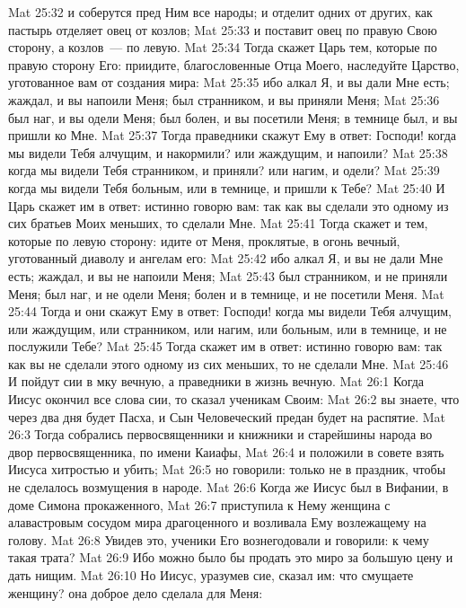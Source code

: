 \vs Mat 25:32 и соберутся пред Ним все народы; и отделит одних от других, как пастырь отделяет овец от козлов;
\vs Mat 25:33 и поставит овец по правую Свою сторону, а козлов~--- по левую.
\vs Mat 25:34 Тогда скажет Царь тем, которые по правую сторону Его: приидите, благословенные Отца Моего, наследуйте Царство, уготованное вам от создания мира:
\vs Mat 25:35 ибо алкал Я, и вы дали Мне есть; жаждал, и вы напоили Меня; был странником, и вы приняли Меня;
\vs Mat 25:36 был наг, и вы одели Меня; был болен, и вы посетили Меня; в темнице был, и вы пришли ко Мне.
\vs Mat 25:37 Тогда праведники скажут Ему в ответ: Господи! когда мы видели Тебя алчущим, и накормили? или жаждущим, и напоили?
\vs Mat 25:38 когда мы видели Тебя странником, и приняли? или нагим, и одели?
\vs Mat 25:39 когда мы видели Тебя больным, или в темнице, и пришли к Тебе?
\vs Mat 25:40 И Царь скажет им в ответ: истинно говорю вам: так как вы сделали это одному из сих братьев Моих меньших, то сделали Мне.
\vs Mat 25:41 Тогда скажет и тем, которые по левую сторону: идите от Меня, проклятые, в огонь вечный, уготованный диаволу и ангелам его:
\vs Mat 25:42 ибо алкал Я, и вы не дали Мне есть; жаждал, и вы не напоили Меня;
\vs Mat 25:43 был странником, и не приняли Меня; был наг, и не одели Меня; болен и в темнице, и не посетили Меня.
\vs Mat 25:44 Тогда и они скажут Ему в ответ: Господи! когда мы видели Тебя алчущим, или жаждущим, или странником, или нагим, или больным, или в темнице, и не послужили Тебе?
\vs Mat 25:45 Тогда скажет им в ответ: истинно говорю вам: так как вы не сделали этого одному из сих меньших, то не сделали Мне.
\vs Mat 25:46 И пойдут сии в мку вечную, а праведники в жизнь вечную.
\vs Mat 26:1 Когда Иисус окончил все слова сии, то сказал ученикам Своим:
\vs Mat 26:2 вы знаете, что через два дня будет Пасха, и Сын Человеческий предан будет на распятие.
\rsbpar\vs Mat 26:3 Тогда собрались первосвященники и книжники и старейшины народа во двор первосвященника, по имени Каиафы,
\vs Mat 26:4 и положили в совете взять Иисуса хитростью и убить;
\vs Mat 26:5 но говорили: только не в праздник, чтобы не сделалось возмущения в народе.
\rsbpar\vs Mat 26:6 Когда же Иисус был в Вифании, в доме Симона прокаженного,
\vs Mat 26:7 приступила к Нему женщина с алавастровым сосудом мира драгоценного и возливала Ему возлежащему на голову.
\vs Mat 26:8 Увидев это, ученики Его вознегодовали и говорили: к чему такая трата?
\vs Mat 26:9 Ибо можно было бы продать это миро за большую цену и дать нищим.
\vs Mat 26:10 Но Иисус, уразумев сие, сказал им: что смущаете женщину? она доброе дело сделала для Меня:
